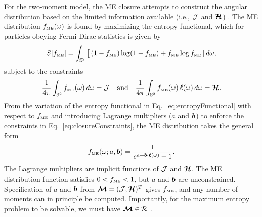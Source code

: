 For the two-moment model, the ME closure attempts to construct the angular distribution based on the limited information available (i.e., $\mathcal{J}$ and $\boldsymbol{\mathcal{H}}$) \cite{cernohorskyBludman_1994,lareckiBanach_2011}.  
The ME distribution $f_{\mbox{\tiny ME}}(\omega)$ is found by maximizing the entropy functional, which for particles obeying Fermi-Dirac statistics is given by
\begin{equation}
  S[f_{\mbox{\tiny ME}}] 
  = \int_{\mathbb{S}^{2}}\big[\,(1-f_{\mbox{\tiny ME}})\log(1-f_{\mbox{\tiny ME}}) + f_{\mbox{\tiny ME}}\log f_{\mbox{\tiny ME}}\,]\,d\omega,
  \label{eq:entropyFunctional}
\end{equation} 
subject to the constraints
\begin{equation}
  \frac{1}{4\pi}\int_{\mathbb{S}^{2}}f_{\mbox{\tiny ME}}(\omega)\,d\omega=\mathcal{J}
  \quad\text{and}\quad
  \frac{1}{4\pi}\int_{\mathbb{S}^{2}}f_{\mbox{\tiny ME}}(\omega)\,\boldsymbol{\ell}(\omega)\,d\omega=\boldsymbol{\mathcal{H}}.  
  \label{eq:closureConstraints}
\end{equation}
From the variation of the entropy functional in Eq.~\eqref{eq:entropyFunctional} with respect to $f_{\mbox{\tiny ME}}$ and introducing Lagrange multipliers ($a$ and $\boldsymbol{b}$) to enforce the constraints in Eq.~\eqref{eq:closureConstraints}, the ME distribution takes the general form \cite{cernohorskyBludman_1994}
\begin{equation}
  f_{\mbox{\tiny ME}}(\omega;a,\boldsymbol{b})=\frac{1}{e^{a + \boldsymbol{b}\cdot\boldsymbol{\ell}(\omega)}+1}.  
  \label{eq:fME}
\end{equation}
The Lagrange multipliers are implicit functions of $\mathcal{J}$ and $\boldsymbol{\mathcal{H}}$.  
The ME distribution function satisfies $0 < f_{\mbox{\tiny ME}} < 1$, but $a$ and $\boldsymbol{b}$ are unconstrained.  
Specification of $a$ and $\boldsymbol{b}$ from $\boldsymbol{\mathcal{M}}=(\mathcal{J},\boldsymbol{\mathcal{H}})^{T}$ gives $f_{\mbox{\tiny ME}}$, and any number of moments can in principle be computed.  
Importantly, for the maximum entropy problem to be solvable, we must have $\boldsymbol{\mathcal{M}}\in\mathcal{R}$ \cite{lareckiBanach_2011}.  

